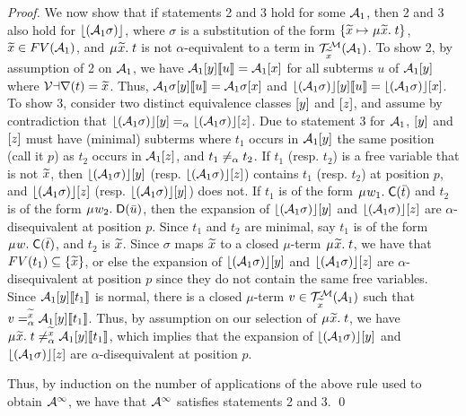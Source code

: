 \begin{report}
\begin{proof}
We now show that if statements 2 and 3 hold for some $\mathcal{A}_1$,
then 2 and 3 also hold for $\lfloor(\mathcal{A}_1 \sigma)\rfloor$,
where $\sigma$ is a substitution of the form $\{ {\Varec{x}} \mapsto \MU{\Varec{x}}.\; t \}$,
${\widetilde{x}} \in FV( \mathcal{A}_1 )$,
and $\MU {\Varec{x}}.\; t$ is not $\alpha$-equivalent to a term in $\mathcal{T}^{\mathcal{M}}_{\widetilde{x}}(\mathcal{A}_1)$.
To show 2,
by assumption of 2 on $\mathcal{A}_1$, we have $\mathcal{A}_1 [y] \llbracket  u  \rrbracket = \mathcal{A}_1 [x]$ for
all subterms $u$ of $\mathcal{A}_1 [y]$ where $\mathcal{Var}(t) = {\widetilde{x}}$.
Thus, $\mathcal{A}_1 \sigma [y] \llbracket  u  \rrbracket = \mathcal{A}_1 \sigma [x]$ and
$\lfloor(\mathcal{A}_1 \sigma)\rfloor [y] \llbracket  u  \rrbracket = \lfloor(\mathcal{A}_1 \sigma)\rfloor [x]$.
To show 3, 
consider two distinct equivalence classes $[y]$ and $[z]$,
and assume by contradiction that $\lfloor(\mathcal{A}_1 \sigma)\rfloor [y] \mathrel{=_\alpha} \lfloor(\mathcal{A}_1 \sigma)\rfloor [z]$.
Due to statement 3 for $\mathcal{A}_1$,
$[y]$ and $[z]$ must have (minimal) subterms 
where $t_1$ occurs in $\mathcal{A}_1 [y]$ the same position (call it $p$) as $t_2$ occurs in $\mathcal{A}_1 [z]$,
and $t_1 \not\mathrel{=_\alpha} t_2$.
If $t_1$ (resp. $t_2$) is a free variable that is not ${\widetilde{x}}$,
then $\lfloor(\mathcal{A}_1 \sigma)\rfloor [y]$ (resp. $\lfloor(\mathcal{A}_1 \sigma)\rfloor [z]$)
contains $t_1$ (resp. $t_2$) at position $p$,
and $\lfloor(\mathcal{A}_1 \sigma)\rfloor [z]$ (resp. $\lfloor(\mathcal{A}_1 \sigma)\rfloor [y]$) does not.
If $t_1$ is of the form $\MU w_1.\; \const{C}( \vec t )$ 
and $t_2$ is of the form $\MU w_2.\; \const{D}( \vec u )$,
then the expansion  of $\lfloor(\mathcal{A}_1 \sigma)\rfloor [y]$ and $\lfloor(\mathcal{A}_1 \sigma)\rfloor [z]$
are $\alpha$-disequivalent at position $p$.
Since $t_1$ and $t_2$ are minimal,
say $t_1$ is of the form $\MU w.\; \const{C}( \vec t )$,
and $t_2$ is ${\widetilde{x}}$.
Since $\sigma$ maps ${\widetilde{x}}$ to a closed $\mu$-term $\MU {\Varec{x}}.\; t$,
we have that $FV( t_1 ) \subseteq \{ {\widetilde{x}} \}$,
or else the expansion of $\lfloor(\mathcal{A}_1 \sigma)\rfloor [y]$ and $\lfloor(\mathcal{A}_1 \sigma)\rfloor [z]$
are $\alpha$-disequivalent at position $p$ since they do not contain the same free variables.
Since $\mathcal{A}_1 [y] \llbracket t_1 \rrbracket$ is normal,
there is a closed $\mu$-term $v \in \mathcal{T}^{\mathcal{M}}_{\widetilde{x}}( \mathcal{A}_1 )$
such that $v \mathrel{=^{\widetilde{x}}_\alpha} \mathcal{A}_1 [y] \llbracket t_1 \rrbracket$.
Thus, by assumption on our selection of $\MU {\Varec{x}}.\; t$,
we have $\MU {\Varec{x}}.\; t \not\vsimv{\Varec{x}} \Val_1 \ec{y} \interp{t_1}$,
which implies that the expansion of $\lfloor(\mathcal{A}_1 \sigma)\rfloor [y]$ and $\lfloor(\mathcal{A}_1 \sigma)\rfloor [z]$
are $\alpha$-disequivalent at position $p$. 

Thus, by induction on the number of applications of the above rule used to obtain $\mathcal{A}^\infty$,
we have that $\mathcal{A}^\infty$ satisfies statements 2 and 3.
\qed
\end{proof}
\end{report}

